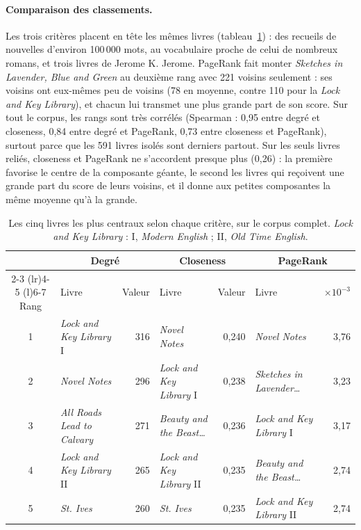 \paragraph{Comparaison des classements.} Les trois critères placent en tête les
mêmes livres (tableau~\ref{tab:top}) : des recueils de nouvelles d'environ
100\,000 mots, au vocabulaire proche de celui de nombreux romans, et trois
livres de Jerome K. Jerome. PageRank fait monter \emph{Sketches in Lavender,
Blue and Green} au deuxième rang avec 221 voisins seulement : ses voisins ont
eux-mêmes peu de voisins (78 en moyenne, contre 110 pour la \emph{Lock and Key
Library}), et chacun lui transmet une plus grande part de son score. Sur tout
le corpus, les rangs sont très corrélés (Spearman : 0,95 entre degré et
closeness, 0,84 entre degré et PageRank, 0,73 entre closeness et PageRank),
surtout parce que les 591 livres isolés sont derniers partout. Sur les seuls
livres reliés, closeness et PageRank ne s'accordent presque plus (0,26) : la
première favorise le centre de la composante géante, le second les livres qui
reçoivent une grande part du score de leurs voisins, et il donne aux petites
composantes la même moyenne qu'à la grande.

\begin{table}[t]
\centering
\footnotesize
\setlength{\tabcolsep}{5pt}
\begin{tabular}{@{}clrlrlr@{}}
  \toprule
  & \multicolumn{2}{c}{Degré} & \multicolumn{2}{c}{Closeness}
  & \multicolumn{2}{c}{PageRank} \\
  \cmidrule(lr){2-3} \cmidrule(lr){4-5} \cmidrule(l){6-7}
  Rang & Livre & Valeur & Livre & Valeur & Livre & $\times 10^{-3}$ \\
  \midrule
  1 & \emph{Lock and Key Library} I & 316 & \emph{Novel Notes} & 0,240 & \emph{Novel Notes} & 3,76 \\
  2 & \emph{Novel Notes} & 296 & \emph{Lock and Key Library} I & 0,238 & \emph{Sketches in Lavender\dots} & 3,23 \\
  3 & \emph{All Roads Lead to Calvary} & 271 & \emph{Beauty and the Beast\dots} & 0,236 & \emph{Lock and Key Library} I & 3,17 \\
  4 & \emph{Lock and Key Library} II & 265 & \emph{Lock and Key Library} II & 0,235 & \emph{Beauty and the Beast\dots} & 2,74 \\
  5 & \emph{St. Ives} & 260 & \emph{St. Ives} & 0,235 & \emph{Lock and Key Library} II & 2,74 \\
  \bottomrule
\end{tabular}
\caption{Les cinq livres les plus centraux selon chaque critère, sur le corpus
  complet. \emph{Lock and Key Library} : I, \emph{Modern English} ; II,
  \emph{Old Time English}.}
\label{tab:top}
\end{table}

